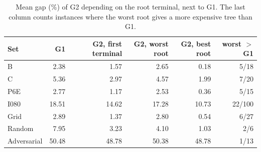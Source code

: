 \begin{table}[!htbp]\centering\small
\begin{tabular}{@{}lrrrrr@{}}\toprule
Set & G1 & G2, first terminal & G2, worst root & G2, best root & worst \(>\) G1\\\midrule
B & 2.38 & 1.57 & 2.65 & 0.18 & 5/18\\
C & 5.36 & 2.97 & 4.57 & 1.99 & 7/20\\
P6E & 2.77 & 1.17 & 2.53 & 0.36 & 5/15\\
I080 & 18.51 & 14.62 & 17.28 & 10.73 & 22/100\\
Grid & 2.89 & 1.37 & 2.80 & 0.54 & 6/27\\
Random & 7.95 & 3.23 & 4.10 & 1.03 & 2/6\\
Adversarial & 50.48 & 48.78 & 50.38 & 48.78 & 1/13\\
\bottomrule\end{tabular}
\caption{Mean gap (\%) of G2 depending on the root terminal, next to G1. The last column counts instances where the worst root gives a more expensive tree than G1.}\label{tab:sphroots}
\end{table}
